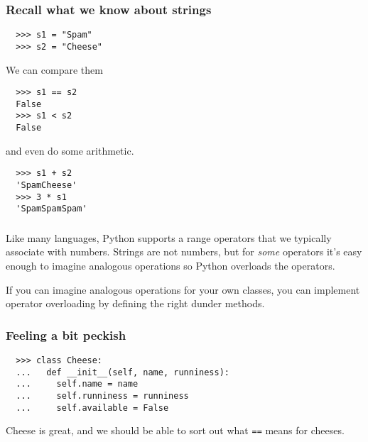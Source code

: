 \documentclass[aspectratio=169]{beamer}
\begin{document}
\begin{frame}[fragile]
  \frametitle{Recall what we know about strings}
  
  \begin{verbatim}
  >>> s1 = "Spam"
  >>> s2 = "Cheese"
  \end{verbatim}  
  We can compare them
  \begin{verbatim}
  >>> s1 == s2
  False
  >>> s1 < s2
  False
  \end{verbatim}  
  and even do some arithmetic.
  \begin{verbatim}
  >>> s1 + s2
  'SpamCheese'
  >>> 3 * s1
  'SpamSpamSpam'
  \end{verbatim}
  
  \end{frame}

\begin{frame}
  \frametitle{} 
  
  Like many languages, Python supports a range operators that we typically associate with numbers. 
  Strings are not numbers, but for \emph{some} operators it's easy enough to imagine analogous operations so 
  Python overloads the operators.
  
  \bigbreak
  If you can imagine analogous operations for your own classes, you can implement operator overloading by defining the right dunder methods.
  
 \end{frame}
 
\begin{frame}[fragile]
  \frametitle{Feeling a bit peckish}
  
  \begin{Verbatim}
  >>> class Cheese:
  ...   def __init__(self, name, runniness):
  ...     self.name = name
  ...     self.runniness = runniness
  ...     self.available = False  
  \end{Verbatim}
  
  \bigbreak
  Cheese is great, and we should be able to sort out what \texttt{==} means for cheeses.
 \end{frame}
  
\end{document}

